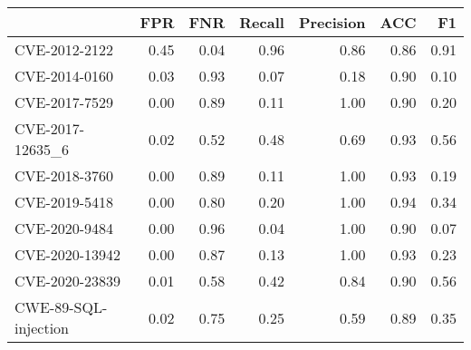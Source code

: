 \begin{tabular}{lrrrrrr}
\toprule
{} &  FPR &  FNR &  Recall &  Precision &  ACC &   F1 \\
\midrule
CVE-2012-2122        & 0.45 & 0.04 &    0.96 &       0.86 & 0.86 & 0.91 \\
CVE-2014-0160        & 0.03 & 0.93 &    0.07 &       0.18 & 0.90 & 0.10 \\
CVE-2017-7529        & 0.00 & 0.89 &    0.11 &       1.00 & 0.90 & 0.20 \\
CVE-2017-12635\_6     & 0.02 & 0.52 &    0.48 &       0.69 & 0.93 & 0.56 \\
CVE-2018-3760        & 0.00 & 0.89 &    0.11 &       1.00 & 0.93 & 0.19 \\
CVE-2019-5418        & 0.00 & 0.80 &    0.20 &       1.00 & 0.94 & 0.34 \\
CVE-2020-9484        & 0.00 & 0.96 &    0.04 &       1.00 & 0.90 & 0.07 \\
CVE-2020-13942       & 0.00 & 0.87 &    0.13 &       1.00 & 0.93 & 0.23 \\
CVE-2020-23839       & 0.01 & 0.58 &    0.42 &       0.84 & 0.90 & 0.56 \\
CWE-89-SQL-injection & 0.02 & 0.75 &    0.25 &       0.59 & 0.89 & 0.35 \\
\bottomrule
\end{tabular}
